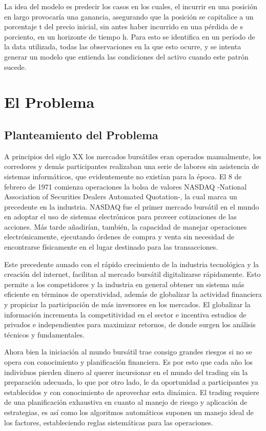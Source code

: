 \documentclass[a4paper,12pt]{Latex/Classes/PhDthesisPSnPDF}
\begin{document}
La idea del modelo es predecir los casos en los cuales, el incurrir en una posición en largo provocaría una ganancia, asegurando que la posición se capitalice a un porcentaje t del precio inicial, sin antes haber incurrido en una pérdida de s porciento, en un horizonte de tiempo h. Para esto se identifica en un período de la data utilizada, todas las observaciones en la que esto ocurre, y se intenta generar un modelo que entienda las condiciones del activo cuando este patrón sucede.


\chapter{El Problema}

\section{Planteamiento del Problema}

A principios del siglo XX los mercados bursátiles eran operados manualmente, los corredores y demás participantes realizaban una serie de labores sin asistencia de sistemas informáticos, que evidentemente no existían para la época. El 8 de febrero de 1971 comienza operaciones la bolsa de valores NASDAQ -National Association of Securities Dealers Automated Quotation-, la cual marca un precedente en la industria. NASDAQ fue el primer mercado bursátil en el mundo en adoptar el uso de sistemas electrónicos para proveer cotizaciones de las acciones. Más tarde añadirían, también, la capacidad de manejar operaciones electrónicamente, ejecutando órdenes de compra y venta sin necesidad de encontrarse físicamente en el lugar destinado para las transacciones.

Este precedente aunado con el rápido crecimiento de la industria tecnológica y la creación del internet, facilitan al mercado bursátil digitalizarse rápidamente. Esto permite a los competidores y la industria en general obtener un sistema más eficiente en términos de operatividad, además de globalizar la actividad financiera y propiciar la participación de más inversores en los mercados. El globalizar la información incrementa la competitividad en el sector e incentiva estudios de privados e independientes para maximizar retornos, de donde surgen los análisis técnicos y fundamentales.

Ahora bien la iniciación al mundo bursátil trae consigo grandes riesgos si no se opera con conocimiento y planificación financiera. Es por esto que cada año los individuos pierden dinero al querer incursionar en el mundo del trading sin la preparación adecuada, lo que por otro lado, le da oportunidad a participantes ya establecidos y con conocimiento de aprovechar esta dinámica. El trading requiere de una planificación exhaustiva en cuanto al manejo de riesgo y aplicación de estrategias, es así como los algoritmos automáticos suponen un manejo ideal de los factores, estableciendo reglas sistemáticas para las operaciones.
\end{document}
